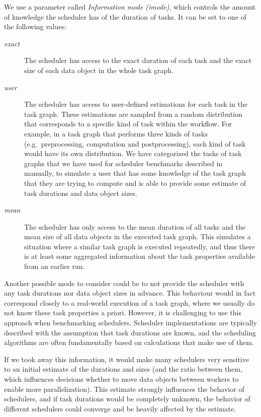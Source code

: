 \begin{description}
		We use a parameter called \emph{Information mode (imode)}, which controls the amount of knowledge the
		scheduler has of the duration of tasks. It can be set to one of the following values:
		\begin{description}
			\item[\emph{exact}] The scheduler has access to the exact duration of each task and the exact size of each data object
				in the whole task graph.
			\item[\emph{user}] The scheduler has access to user-defined estimations for each task in the task graph. These
				estimations are sampled from a random distribution that corresponds to a specific kind of task
				within the workflow. For example, in a task graph that performs three kinds of tasks (e.g.\
				preprocessing, computation and postprocessing), each kind of task would have its own distribution.
				We have categorized the tasks of task graphs that we have used for scheduler benchmarks described
				in~\Autoref{sec:estee-benchmarks} manually, to simulate a user that has some knowledge of the task graph
				that they are trying to compute and is able to provide some estimate of task durations and data
				object sizes.
			\item[\emph{mean}] The scheduler has only access to the mean duration of all tasks and the mean size of all data
				objects in the executed task graph. This simulates a situation where a similar task graph is
				executed repeatedly, and thus there is at least some aggregated information about the task
				properties available from an earlier run.
		\end{description}
		Another possible mode to consider could be to not provide the scheduler with any task durations nor
		data object sizes in advance. This behaviour would in fact correspond closely to a real-world
		execution of a task graph, where we usually do not know these task properties a priori. However, it
		is challenging to use this approach when benchmarking schedulers. Scheduler implementations are
		typically described with the assumption that task durations are known, and the scheduling
		algorithms are often fundamentally based on calculations that make use of them.

		If we took away this information, it would make many schedulers very sensitive to an initial
		estimate of the durations and sizes (and the ratio between them, which influences decisions whether
		to move data objects between workers to enable more parallelization). This estimate strongly
		influences the behavior of schedulers, and if task durations would be completely unknown, the
		behavior of different schedulers could converge and be heavily affected by the estimate.


\end{description}
